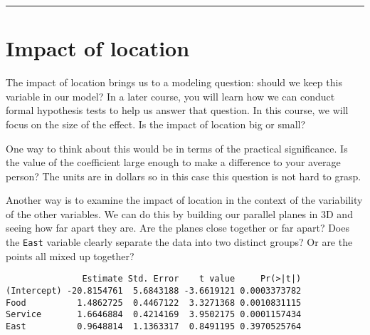 \documentclass[
]{book}
\newenvironment{Shaded}{\begin{snugshade}}{\end{snugshade}}
\newcommand{\DataTypeTok}[1]{\textcolor[rgb]{0.13,0.29,0.53}{#1}}
\newcommand{\KeywordTok}[1]{\textcolor[rgb]{0.13,0.29,0.53}{\textbf{#1}}}
\newcommand{\NormalTok}[1]{#1}
\newcommand{\OperatorTok}[1]{\textcolor[rgb]{0.81,0.36,0.00}{\textbf{#1}}}
\newcommand{\StringTok}[1]{\textcolor[rgb]{0.31,0.60,0.02}{#1}}
\begin{document}
\begin{center}\rule{0.5\linewidth}{0.5pt}\end{center}

\hypertarget{impact-of-location}{%
\section{Impact of location}\label{impact-of-location}}

The impact of location brings us to a modeling question: should we keep this variable in our model? In a later course, you will learn how we can conduct formal hypothesis tests to help us answer that question. In this course, we will focus on the size of the effect. Is the impact of location big or small?

One way to think about this would be in terms of the practical significance. Is the value of the coefficient large enough to make a difference to your average person? The units are in dollars so in this case this question is not hard to grasp.

Another way is to examine the impact of location in the context of the variability of the other variables. We can do this by building our parallel planes in 3D and seeing how far apart they are. Are the planes close together or far apart? Does the \texttt{East} variable clearly separate the data into two distinct groups? Or are the points all mixed up together?

\begin{Shaded}
\end{Shaded}

\begin{verbatim}
               Estimate Std. Error    t value     Pr(>|t|)
(Intercept) -20.8154761  5.6843188 -3.6619121 0.0003373782
Food          1.4862725  0.4467122  3.3271368 0.0010831115
Service       1.6646884  0.4214169  3.9502175 0.0001157434
East          0.9648814  1.1363317  0.8491195 0.3970525764
\end{verbatim}
\end{document}
